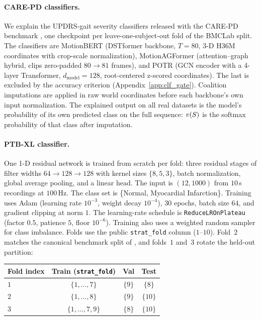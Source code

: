 \paragraph{CARE-PD classifiers.}
We explain the UPDRS-gait severity classifiers released with the CARE-PD
benchmark \citep{adeli2025multi}, one checkpoint per leave-one-subject-out
fold of the BMCLab split.  The classifiers are MotionBERT
\citep{zhu2023motionbert} (DSTformer backbone, $T{=}80$, 3-D H36M
coordinates with crop-scale normalization), MotionAGFormer
\citep{mehraban2024motionagformer} (attention--graph hybrid, clips
zero-padded $80 \to 81$ frames), and POTR \citep{martinez2021pose} (GCN
encoder with a 4-layer Transformer, $d_{\mathrm{model}}{=}128$, root-centered
z-scored coordinates).  The last is excluded by the accuracy criterion
(Appendix~\ref{app:clf_gate}).  Coalition imputations are applied in raw world
coordinates before each backbone's own input normalization.  The explained
output on all real datasets is the model's probability of its own predicted
class on the full sequence: $v(S)$ is the softmax probability of that
class after imputation.

\paragraph{PTB-XL classifier.}
One 1-D residual network \citep{wang2017time,strodthoff2021ecg} is trained
from scratch per fold: three residual stages of filter widths
$64{\to}128{\to}128$ with kernel sizes $\{8,5,3\}$, batch normalization,
global average pooling, and a linear head.  The input is $(12, 1000)$ from
$10$\,s recordings at $100$\,Hz.  The class set is \{Normal, Myocardial
Infarction\}.  Training uses Adam (learning rate $10^{-3}$, weight decay
$10^{-4}$), $30$ epochs, batch size $64$, and gradient clipping at norm
$1$.  The learning-rate schedule is \texttt{ReduceLROnPlateau} (factor
$0.5$, patience $5$, floor $10^{-6}$).  Training also uses a weighted
random sampler for class imbalance.  Folds use the public
\texttt{strat\_fold} column ($1$--$10$).  Fold~$2$ matches the canonical
benchmark split of \citet{strodthoff2021ecg}, and folds~$1$ and~$3$ rotate
the held-out partition:
\begin{center}\small
\begin{tabular}{lccc}
\toprule
Fold index & Train (\texttt{strat\_fold}) & Val & Test \\
\midrule
$1$ & $\{1, \ldots, 7\}$    & $\{9\}$ & $\{8\}$  \\
$2$ & $\{1, \ldots, 8\}$    & $\{9\}$ & $\{10\}$ \\
$3$ & $\{1, \ldots, 7, 9\}$ & $\{8\}$ & $\{10\}$ \\
\bottomrule
\end{tabular}
\end{center}

